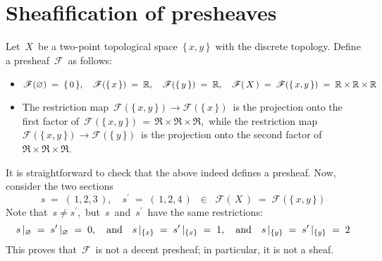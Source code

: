 

\section{Sheafification of presheaves}


\renewcommand{\theenumi}{\roman{enumi}}
\renewcommand{\labelenumi}{\textnormal{(\theenumi)}$\;\;$}


\begin{example}
\mbox{}\vskip 0.1cm
\noindent
Let \,$X$\, be a two-point topological space \,$\{\,x,y\,\}$\, with the discrete topology.
Define a presheaf \,$\mathscr{F}$\, as follows:
\begin{itemize}
\item
	$
	\mathscr{F}(\varnothing) \;=\; \{\,0\,\},
	\quad
	\mathscr{F}(\{\,x\,\}) \;=\; \mathbb{R},
	\quad
	\mathscr{F}(\{\,y\,\}) \;=\; \mathbb{R},
	\quad
	\mathscr{F}(\,X\,) \;=\; \mathscr{F}(\{\,x,y\,\}) \;=\; \mathbb{R} \times \mathbb{R} \times \mathbb{R}
	$
\item
	The restriction map
	\,$\mathscr{F}(\{\,x,y\,\}) \longrightarrow \mathscr{F}(\{\,x\,\})$\,
	is the projection onto the first factor of
	\,$\mathscr{F}(\{\,x,y\,\}) \,=\, \Re \times \Re \times \Re$,\,
	while the restriction map
	\,$\mathscr{F}(\{\,x,y\,\}) \longrightarrow \mathscr{F}(\{\,y\,\})$\,
	is the projection onto the second factor of \,$\Re \times \Re \times \Re$.\,
\end{itemize}
It is straightforward to check that the above indeed defines a presheaf.
Now, consider the two sections
\begin{equation*}
s \;=\; (\,1,2,3\,), \quad s^{\prime} \;=\; (\,1,2,4\,) \;\;\in\;\; \mathscr{F}(\,X\,) \;=\; \mathscr{F}(\{\,x,y\,\})
\end{equation*}
Note that \,$s \neq s^{\prime}$,\, but \,$s$\, and \,$s^{\prime}$\, have the same restrictions:
\begin{equation*}
s\,\vert_{\varnothing} \;=\; s^{\prime}\,\vert_{\varnothing} \;=\; 0,
\quad\textnormal{and}\quad
s\,\vert_{\{x\}} \;=\; s^{\prime}\,\vert_{\{x\}} \;=\; 1,
\quad\textnormal{and}\quad
s\,\vert_{\{y\}} \;=\; s^{\prime}\,\vert_{\{y\}} \;=\; 2
\end{equation*}
This proves that \,$\mathscr{F}$\, is not a decent presheaf; in particular, it is not a sheaf.
\end{example}

